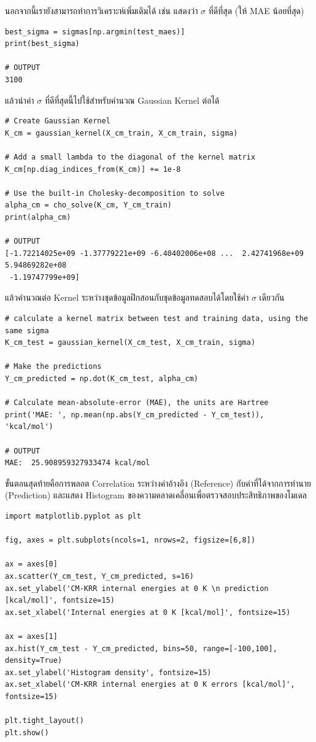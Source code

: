 นอกจากนี้เรายังสามารถทำการวิเคราะห์เพิ่มเติมได้ เช่น แสดงว่า $\sigma$ ที่ดีที่สุด (ให้ MAE น้อยที่สุด)

\begin{lstlisting}[style=MyPython]
best_sigma = sigmas[np.argmin(test_maes)]
print(best_sigma)

# OUTPUT
3100
\end{lstlisting}

\noindent แล้วนำค่า $\sigma$ ที่ดีที่สุดนี้ไปใช้สำหรับคำนวณ Gaussian Kernel ต่อได้

\begin{lstlisting}[style=MyPython]
# Create Gaussian Kernel
K_cm = gaussian_kernel(X_cm_train, X_cm_train, sigma)

# Add a small lambda to the diagonal of the kernel matrix
K_cm[np.diag_indices_from(K_cm)] += 1e-8

# Use the built-in Cholesky-decomposition to solve
alpha_cm = cho_solve(K_cm, Y_cm_train)
print(alpha_cm)

# OUTPUT
[-1.72214025e+09 -1.37779221e+09 -6.40402006e+08 ...  2.42741968e+09  5.94869282e+08
 -1.19747799e+09]
\end{lstlisting}

\noindent แล้วคำนวณต่อ Kernel ระหว่างชุดข้อมูลฝึกสอนกับชุดข้อมูลทดสอบได้โดยใช้ค่า $\sigma$ เดียวกัน

\begin{lstlisting}[style=MyPython]
# calculate a kernel matrix between test and training data, using the same sigma
K_cm_test = gaussian_kernel(X_cm_test, X_cm_train, sigma)

# Make the predictions
Y_cm_predicted = np.dot(K_cm_test, alpha_cm)

# Calculate mean-absolute-error (MAE), the units are Hartree
print('MAE: ', np.mean(np.abs(Y_cm_predicted - Y_cm_test)), 'kcal/mol')

# OUTPUT
MAE:  25.908959327933474 kcal/mol
\end{lstlisting}

ขั้นตอนสุดท้ายคือการพลอต Correlation ระหว่างค่าอ้างอิง (Reference) กับค่าที่ได้จากการทำนาย (Prediction) และแสดง Histogram 
ของความคลาดเคลื่อนเพื่อตรวจสอบประสิทธิภาพของโมเดล

\begin{lstlisting}[style=MyPython]
import matplotlib.pyplot as plt

fig, axes = plt.subplots(ncols=1, nrows=2, figsize=[6,8])

ax = axes[0]
ax.scatter(Y_cm_test, Y_cm_predicted, s=16)
ax.set_ylabel('CM-KRR internal energies at 0 K \n prediction [kcal/mol]', fontsize=15)
ax.set_xlabel('Internal energies at 0 K [kcal/mol]', fontsize=15)

ax = axes[1]
ax.hist(Y_cm_test - Y_cm_predicted, bins=50, range=[-100,100], density=True)
ax.set_ylabel('Histogram density', fontsize=15)
ax.set_xlabel('CM-KRR internal energies at 0 K errors [kcal/mol]', fontsize=15)

plt.tight_layout()
plt.show()
\end{lstlisting}

